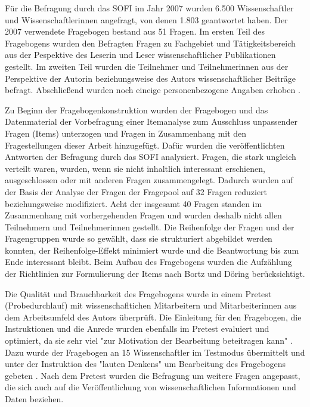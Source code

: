Für die Befragung durch das SOFI im Jahr 2007 wurden 6.500 Wissenschaftler und Wissenschaftlerinnen angefragt, von denen 1.803 geantwortet haben. Der 2007 verwendete Fragebogen bestand aus 51 Fragen. Im ersten Teil des Fragebogens wurden den Befragten Fragen zu Fachgebiet und Tätigkeitsbereich aus der Pespektive des Leserin und Leser wissenschaftlicher Publikationen gestellt. Im zweiten Teil wurden die Teilnehmer und Teilnehmerinnen aus der Perspektive der Autorin beziehungsweise des Autors wissenschaftlicher Beiträge befragt. Abschließend wurden noch eineige personenbezogene Angaben erhoben \cite{Hanekop_Wittke_2007_Fragebogen}.

Zu Beginn der Fragebogenkonstruktion wurden der Fragebogen und das Datenmaterial der Vorbefragung einer Itemanalyse zum Ausschluss unpassender Fragen (Items) unterzogen und Fragen in Zusammenhang mit den Fragestellungen dieser Arbeit hinzugefügt. Dafür wurden die veröffentlichten Antworten der Befragung durch das SOFI analysiert. Fragen, die stark ungleich verteilt waren, wurden, wenn sie nicht inhaltlich interessant erschienen, ausgeschlossen oder mit anderen Fragen zusammengelegt. Dadurch wurden auf der Basis der Analyse der Fragen der Fragepool auf 32 Fragen reduziert beziehungsweise modifiziert. Acht der insgesamt 40 Fragen standen im Zusammenhang mit vorhergehenden Fragen und wurden deshalb nicht allen Teilnehmern und Teilnehmerinnen gestellt. Die Reihenfolge der Fragen und der Fragengruppen wurde so gewählt, dass sie strukturiert abgebildet werden konnten, der Reihenfolge-Effekt minimiert wurde und die Beantwortung bis zum Ende interessant bleibt. Beim Aufbau des Fragebogens wurden die Aufzählung der Richtlinien zur Formulierung der Items nach Bortz und Döring \cite{raab_2012_fragebogen} berücksichtigt.

Die Qualität und Brauchbarkeit des Fragebogens wurde in einem Pretest (Probedurchlauf) mit wissenschafltichen Mitarbeitern und Mitarbeiterinnen aus dem Arbeitsumfeld des Autors überprüft. Die Einleitung für den Fragebogen, die Instruktionen und die Anrede wurden ebenfalls im Pretest evaluiert und optimiert, da sie sehr viel "zur Motivation der Bearbeitung beteitragen kann" \cite{raab_2012_fragebogen}. Dazu wurde der Fragebogen an 15 Wissenschaftler im Testmodus übermittelt und unter der Instruktion des "lauten Denkens" um Bearbeitung des Fragebogens gebeten \cite{raab_2012_fragebogen}. Nach dem Pretest wurden die Befragung um weitere Fragen angepasst, die sich auch auf die Veröffentlichung von wissenschaftlichen Informationen und Daten beziehen.

